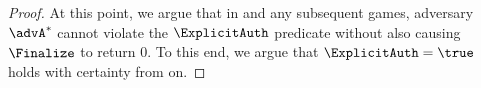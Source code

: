 \begin{proof}
%	
%
%	
	
	At this point, we argue that in \thisGame and any subsequent games, adversary $\advA^\ast$ cannot violate the $\ExplicitAuth$ predicate without also causing $\Finalize$ to return $0$. 
	To this end, we argue that $\ExplicitAuth = \true$ holds with certainty from \thisGame on.
	

\end{proof}
